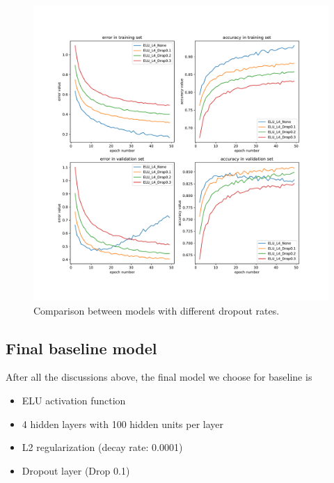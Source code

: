 \documentclass{article}
\begin{document}
\begin{figure}[tb]
\begin{center}
\centerline{\includegraphics[width=\columnwidth]{fig/dropout.pdf}}
\caption{Comparison between models with different dropout rates.}
\label{fig:base_dropout}
\end{center}
\end{figure} 





\subsection{Final baseline model}
After all the discussions above, the final model we choose for baseline is
\begin{itemize}
	\item ELU activation function
	\item 4 hidden layers with 100 hidden units per layer
	\item L2 regularization (decay rate: 0.0001)
	\item Dropout layer (Drop 0.1)
\end{itemize}
\end{document}
